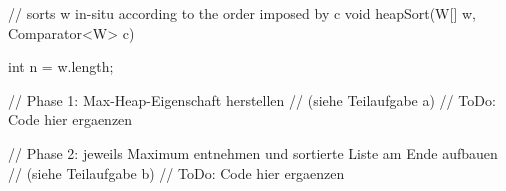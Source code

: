 \documentclass{bschlangaul-aufgabe}
\begin{document}
\begin{enumerate}
\begin{liJavaAngabe}
// sorts w in-situ according to the order imposed by c
void heapSort(W[] w, Comparator<W> c) {
  int n = w.length;

  // Phase 1: Max-Heap-Eigenschaft herstellen
  // (siehe Teilaufgabe a)
  // ToDo: Code hier ergaenzen

  // Phase 2: jeweils Maximum entnehmen und sortierte Liste am Ende aufbauen
  // (siehe Teilaufgabe b)
  // ToDo: Code hier ergaenzen
}
\end{liJavaAngabe}

\begin{liAdditum}
\end{liAdditum}

\end{enumerate}
\end{document}
